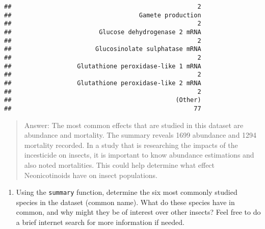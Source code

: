 \documentclass[]{article}
\newenvironment{Shaded}{\begin{snugshade}}{\end{snugshade}}
\newcommand{\KeywordTok}[1]{\textcolor[rgb]{0.13,0.29,0.53}{\textbf{#1}}}
\newcommand{\NormalTok}[1]{#1}
\newcommand{\OperatorTok}[1]{\textcolor[rgb]{0.81,0.36,0.00}{\textbf{#1}}}
\providecommand{\tightlist}{%
  \setlength{\itemsep}{0pt}\setlength{\parskip}{0pt}}
\begin{document}
\begin{verbatim}
##                                                   2 
##                                   Gamete production 
##                                                   2 
##                        Glucose dehydrogenase 2 mRNA 
##                                                   2 
##                       Glucosinolate sulphatase mRNA 
##                                                   2 
##                  Glutathione peroxidase-like 1 mRNA 
##                                                   2 
##                  Glutathione peroxidase-like 2 mRNA 
##                                                   2 
##                                             (Other) 
##                                                  77
\end{verbatim}

\begin{quote}
Answer: The most common effects that are studied in this dataset are
abundance and mortality. The summary reveals 1699 abundance and 1294
mortality recorded. In a study that is researching the impacts of the
incesticide on insects, it is important to know abundance estimations
and also noted mortalities. This could help determine what effect
Neonicotinoids have on insect populations.
\end{quote}

\begin{enumerate}
\def\labelenumi{\arabic{enumi}.}
\setcounter{enumi}{6}
\tightlist
\item
  Using the \texttt{summary} function, determine the six most commonly
  studied species in the dataset (common name). What do these species
  have in common, and why might they be of interest over other insects?
  Feel free to do a brief internet search for more information if
  needed.
\end{enumerate}

\begin{Shaded}
\end{Shaded}
\end{document}
